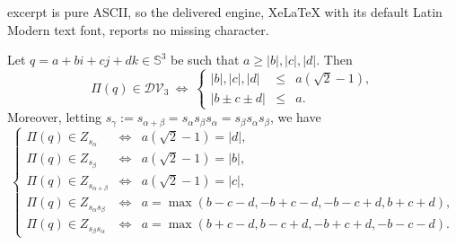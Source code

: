 \documentclass[10pt,a4paper]{amsart}
\newcommand{\Sph}{\mathbb{S}}
\begin{document}
excerpt is pure ASCII, so the delivered engine, XeLaTeX with its default Latin Modern text font, reports no missing character.
\begin{lem}\label{tcube}
Let $q=a+bi+cj+dk\in\Sph^3$ be such that $a\ge|b|,|c|,|d|$. Then
\[\Pi(q)\in\mathcal{DV}_3~\Longleftrightarrow~\left\{\begin{array}{rcl}|b|,|c|,|d| & \le & a(\sqrt{2}-1), \\[.5em] |b\pm c\pm d| & \le & a.\end{array}\right.\]
Moreover, letting $s_\gamma:=s_{\alpha+\beta}=s_\alpha s_\beta s_\alpha=s_\beta s_\alpha s_\beta$, we have
\begin{equation}\label{partial}\tag{$\partial$}
\left\{\begin{array}{rcl}
\Pi(q)\in Z_{s_\alpha} & \Longleftrightarrow & a(\sqrt{2}-1)=|d|, \\[.5em]
\Pi(q)\in Z_{s_\beta} & \Longleftrightarrow & a(\sqrt{2}-1)=|b|, \\[.5em]
\Pi(q)\in Z_{s_{\alpha+\beta}} & \Longleftrightarrow & a(\sqrt{2}-1)=|c|, \\[.5em]
\Pi(q)\in Z_{s_\alpha s_\beta} & \Longleftrightarrow & a=\max(b-c-d,-b+c-d,-b-c+d,b+c+d), \\[.5em]
\Pi(q)\in Z_{s_\beta s_\alpha} & \Longleftrightarrow & a=\max(b+c-d,b-c+d,-b+c+d,-b-c-d).\end{array}\right.
\end{equation}
\end{lem}
\end{document}
